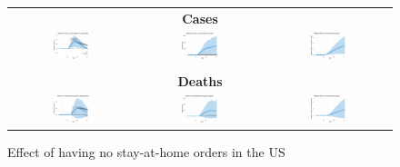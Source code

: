 \documentclass[3p, longtitle]{elsarticle}
\theoremstyle{definition}
\begin{document}
\begin{figure}[ht]
  \caption{Effect of having no stay-at-home orders in the US\label{fig:US-shelter}}
  \begin{minipage}{\linewidth}
    \centering
    \begin{tabular}{ccc}
      \multicolumn{3}{c}{\textbf{Cases}} \\
      \includegraphics[width=0.31\textwidth]{tables_and_figures/us-shelter-dgrowth_idx}
      &
        \includegraphics[width=0.31\textwidth]{tables_and_figures/us-shelter-dcases_idx}
      &

        \includegraphics[width=0.31\textwidth]{tables_and_figures/us-shelter-rcumu_idx}
      \\
      \\
      \multicolumn{3}{c}{\textbf{Deaths}} \\
      \includegraphics[width=0.31\textwidth]{tables_and_figures/us-shelter-dgrowth_deaths_idx}
      &
      \includegraphics[width=0.31\textwidth]{tables_and_figures/us-shelter-dcases_deaths_idx}
      &
        \includegraphics[width=0.31\textwidth]{tables_and_figures/us-shelter-rcumu_deaths_idx}
    \end{tabular}


\end{minipage}
\end{figure}
\end{document}
